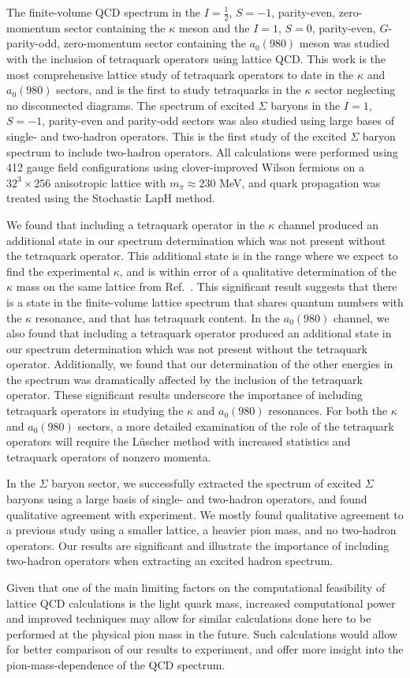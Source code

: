 The finite-volume QCD spectrum in the $I=\frac{1}{2}$, $S=-1$, parity-even, zero-momentum sector containing the $\kappa$ meson and the $I=1$, $S=0$, parity-even, $G$-parity-odd, zero-momentum sector containing the $a_0(980)$ meson was studied with the inclusion of tetraquark operators using lattice QCD. This work is the most comprehensive lattice study of tetraquark operators to date in the $\kappa$ and $a_0(980)$ sectors, and is the first to study tetraquarks in the $\kappa$ sector neglecting no disconnected diagrams. The spectrum of excited $\Sigma$ baryons in the $I=1$, $S=-1$, parity-even and parity-odd sectors was also studied using large bases of single- and two-hadron operators. This is the first study of the excited $\Sigma$ baryon spectrum to include two-hadron operators. All calculations were performed using 412 gauge field configurations using clover-improved Wilson fermions on a $32^3\times 256$ anisotropic lattice with $m_\pi \approx 230$ MeV, and quark propagation was treated using the Stochastic LapH method.

We found that including a tetraquark operator in the $\kappa$ channel produced an additional state in our spectrum determination which was not present without the tetraquark operator. This additional state is in the range where we expect to find the experimental $\kappa$, and is within error of a qualitative determination of the $\kappa$ mass on the same lattice from Ref.~\cite{Brett:2018jqw}. This significant result suggests that there is a state in the finite-volume lattice spectrum that shares quantum numbers with the $\kappa$ resonance, and that has tetraquark content. In the $a_0(980)$ channel, we also found that including a tetraquark operator produced an additional state in our spectrum determination which was not present without the tetraquark operator. Additionally, we found that our determination of the other energies in the spectrum was dramatically affected by the inclusion of the tetraquark operator. These significant results underscore the importance of including tetraquark operators in studying the $\kappa$ and $a_0(980)$ resonances. For both the $\kappa$ and $a_0(980)$ sectors, a more detailed examination of the role of the tetraquark operators will require the L\"uscher method with increased statistics and tetraquark operators of nonzero momenta.

In the $\Sigma$ baryon sector, we successfully extracted the spectrum of excited $\Sigma$ baryons using a large basis of single- and two-hadron operators, and found qualitative agreement with experiment. We mostly found qualitative agreement to a previous study using a smaller lattice, a heavier pion mass, and no two-hadron operators. Our results are significant and illustrate the importance of including two-hadron operators when extracting an excited hadron spectrum.

Given that one of the main limiting factors on the computational feasibility of lattice QCD calculations is the light quark mass, increased computational power and improved techniques may allow for similar calculations done here to be performed at the physical pion mass in the future. Such calculations would allow for better comparison of our results to experiment, and offer more insight into the pion-mass-dependence of the QCD spectrum.